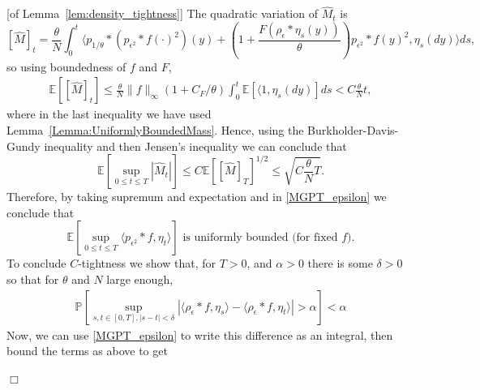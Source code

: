 \documentclass[12pt]{article}
\newenvironment {proof}{{\noindent\bf Proof }}{\hfill $\Box$ \medskip}
\newcommand{\IP}{\mathbb P}
\newcommand{\IE}{\mathbb E}
\begin{document}
\begin{proof}[of Lemma~\ref{lem:density_tightness}]
    The quadratic variation of $\widehat{M}_t$ is
    \[
        [ \widehat{M} ]_t
        =
        \frac{\theta}{N} \int_0^t \langle
            p_{1/\theta}*(p_{\epsilon^2} * f(\cdot)^2)(y)
            +
            \left( 1 + \frac{F(\rho_\epsilon*\eta_s(y))}{\theta} \right)
            p_{\epsilon^2} * f(y)^2
            ,
            \eta_s(dy)
        \rangle ds ,
    \]
    so using boundedness of $f$ and $F$,
    \begin{align*}
        \IE\left[ [\widehat{M}]_t \right]
        \leq
        \frac{\theta}{N} \| f \|_\infty (1 + C_F/\theta)
        \int_0^t \mathbb{E}\left[ \langle 1, \eta_s(dy) \right] ds
        <
        C \frac{\theta}{N} t ,
    \end{align*}
    where in the last inequality we have used Lemma~\ref{Lemma:UniformlyBoundedMass}.
    Hence, using the Burkholder-Davis-Gundy inequality and then Jensen's inequality we can conclude that
    \[
        \IE[\sup_{0 \leq t \leq T} |\widehat{M}_t| ]
        \le
        C
        \IE\left[ [\widehat{M}]_T \right]^{1/2}
        \le
        \sqrt{ C \frac{\theta}{N} T } .
    \]
    Therefore, by taking supremum and expectation and in \eqref{MGPT_epsilon}
    we conclude that
    \begin{equation}
        \label{eq:boundedIntegralAgainstf}
        \IE[ \sup_{0 \leq t \leq T} \langle p_{\epsilon^2} * f, \eta_t \rangle ]
        \text{ is uniformly bounded (for fixed } f \text{)} .
    \end{equation}
    To conclude $C$-tightness we show that, for $T>0$, and $\alpha > 0$
    there is some $\delta >0$ so that for $\theta$ and $N$ large enough,
    \begin{align}
        \IP\left[
            \sup_{s,t \in [0,T], |s-t| < \delta}
            \left|
                \langle \rho_{\epsilon} * f, \eta_s \rangle
                - \langle \rho_{\epsilon} * f, \eta_t \rangle
            \right|
            >
            \alpha
        \right]
        <
        \alpha \label{conditionCtightness}
    \end{align}
    Now, we can use \eqref{MGPT_epsilon} to write this difference
    as an integral, then bound the terms as above to get

\end{proof}
\end{document}
